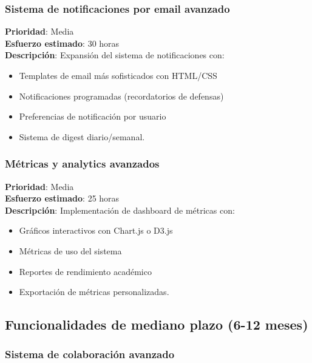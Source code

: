 \documentclass[12pt,a4paper,oneside]{report}
\providecommand{\tightlist}{%
  \setlength{\itemsep}{0pt}\setlength{\parskip}{0pt}}
\begin{document}
\subsubsection{Sistema de notificaciones por email
avanzado}\label{sistema-de-notificaciones-por-email-avanzado}

\textbf{Prioridad}: Media\\
\textbf{Esfuerzo estimado}: 30 horas\\
\textbf{Descripción}: Expansión del sistema de notificaciones con:

\begin{itemize}
\tightlist
\item
  Templates de email más sofisticados con HTML/CSS
\item
  Notificaciones programadas (recordatorios de defensas)
\item
  Preferencias de notificación por usuario
\item
  Sistema de digest diario/semanal.
\end{itemize}

\subsubsection{Métricas y analytics
avanzados}\label{muxe9tricas-y-analytics-avanzados}

\textbf{Prioridad}: Media\\
\textbf{Esfuerzo estimado}: 25 horas\\
\textbf{Descripción}: Implementación de dashboard de métricas con:

\begin{itemize}
\tightlist
\item
  Gráficos interactivos con Chart.js o D3.js
\item
  Métricas de uso del sistema
\item
  Reportes de rendimiento académico
\item
  Exportación de métricas personalizadas.
\end{itemize}

\subsection{Funcionalidades de mediano plazo (6-12
meses)}\label{funcionalidades-de-mediano-plazo-6-12-meses}

\subsubsection{Sistema de colaboración
avanzado}\label{sistema-de-colaboraciuxf3n-avanzado}
\end{document}
